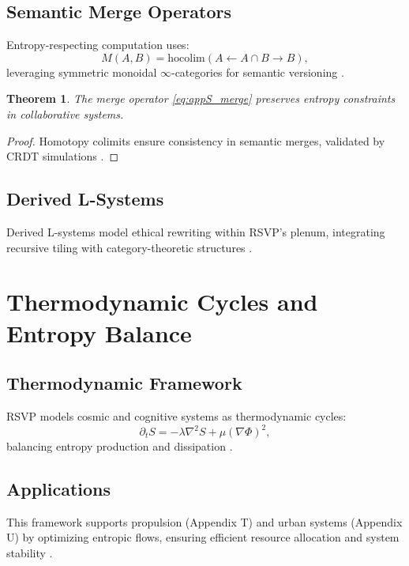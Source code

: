 \documentclass[12pt]{report}
\newtheorem{theorem}{Theorem}[chapter]
\newcommand{\PhiRSVP}{\Phi}
\newcommand{\SRSVP}{S}
\begin{document}
\section{Semantic Merge Operators}
Entropy-respecting computation uses:
\begin{equation}
M(A, B) = \mathrm{hocolim}(A \leftarrow A \cap B \to B), \label{eq:appS_merge}
\end{equation}
leveraging symmetric monoidal \(\infty\)-categories for semantic versioning \citep{Lurie2009}.

\begin{theorem}
The merge operator \eqref{eq:appS_merge} preserves entropy constraints in collaborative systems.
\end{theorem}
\begin{proof}
Homotopy colimits ensure consistency in semantic merges, validated by CRDT simulations \citep{Shapiro2011}.
\end{proof}

\section{Derived L-Systems}
Derived L-systems model ethical rewriting within RSVP’s plenum, integrating recursive tiling with category-theoretic structures \citep{RSVPMeta2025}.

\chapter{Thermodynamic Cycles and Entropy Balance}
\label{app:T}
\section{Thermodynamic Framework}
RSVP models cosmic and cognitive systems as thermodynamic cycles:
\begin{equation}
\partial_t \SRSVP = -\lambda \nabla^2 \SRSVP + \mu (\nabla \PhiRSVP)^2, \label{eq:appT_cycle}
\end{equation}
balancing entropy production and dissipation \citep{Prigogine1977}.

\section{Applications}
This framework supports propulsion (Appendix T) and urban systems (Appendix U) by optimizing entropic flows, ensuring efficient resource allocation and system stability \citep{RSVPMeta2025}.
\end{document}
